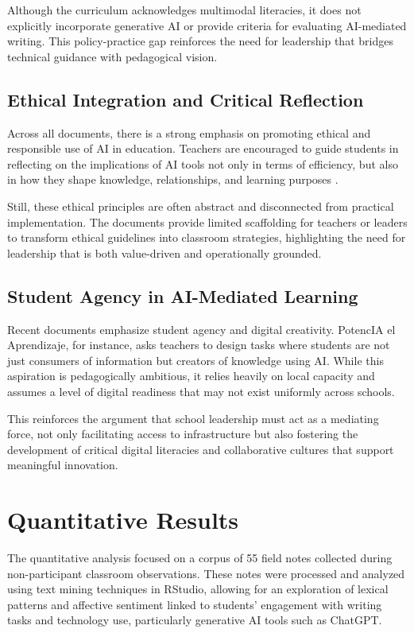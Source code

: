 \documentclass[english]{textolivre}
\begin{document}
Although the curriculum acknowledges multimodal literacies, it does not explicitly incorporate generative AI or provide criteria for evaluating AI-mediated writing. This policy-practice gap reinforces the need for leadership that bridges technical guidance with pedagogical vision.

\subsection{Ethical Integration and Critical Reflection}
Across all documents, there is a strong emphasis on promoting ethical and responsible use of AI in education. Teachers are encouraged to guide students in reflecting on the implications of AI tools not only in terms of efficiency, but also in how they shape knowledge, relationships, and learning purposes \cite{beroiza2026educational}.

Still, these ethical principles are often abstract and disconnected from practical implementation. The documents provide limited scaffolding for teachers or leaders to transform ethical guidelines into classroom strategies, highlighting the need for leadership that is both value-driven and operationally grounded.

\subsection{Student Agency in AI-Mediated Learning}
Recent documents emphasize student agency and digital creativity. PotencIA el Aprendizaje, for instance, asks teachers to design tasks where students are not just consumers of information but creators of knowledge using AI. While this aspiration is pedagogically ambitious, it relies heavily on local capacity and assumes a level of digital readiness that may not exist uniformly across schools.

This reinforces the argument that school leadership must act as a mediating force, not only facilitating access to infrastructure but also fostering the development of critical digital literacies and collaborative cultures that support meaningful innovation.

\section{Quantitative Results}\label{sec-organizacao}
The quantitative analysis focused on a corpus of 55 field notes collected during non-participant classroom observations. These notes were processed and analyzed using text mining techniques in RStudio, allowing for an exploration of lexical patterns and affective sentiment linked to students’ engagement with writing tasks and technology use, particularly generative AI tools such as ChatGPT.
\end{document}
